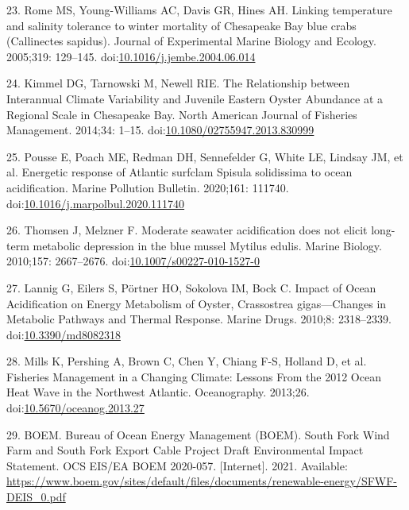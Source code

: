 \documentclass[
  10pt,
]{article}
\begin{document}
\leavevmode\hypertarget{ref-rome_linking_2005}{}%
23. Rome MS, Young-Williams AC, Davis GR, Hines AH. Linking temperature
and salinity tolerance to winter mortality of Chesapeake Bay blue crabs
(Callinectes sapidus). Journal of Experimental Marine Biology and
Ecology. 2005;319: 129--145.
doi:\href{https://doi.org/10.1016/j.jembe.2004.06.014}{10.1016/j.jembe.2004.06.014}

\leavevmode\hypertarget{ref-kimmel_relationship_2014}{}%
24. Kimmel DG, Tarnowski M, Newell RIE. The Relationship between
Interannual Climate Variability and Juvenile Eastern Oyster Abundance at
a Regional Scale in Chesapeake Bay. North American Journal of Fisheries
Management. 2014;34: 1--15.
doi:\href{https://doi.org/10.1080/02755947.2013.830999}{10.1080/02755947.2013.830999}

\leavevmode\hypertarget{ref-pousse_energetic_2020}{}%
25. Pousse E, Poach ME, Redman DH, Sennefelder G, White LE, Lindsay JM,
et al. Energetic response of Atlantic surfclam Spisula solidissima to
ocean acidification. Marine Pollution Bulletin. 2020;161: 111740.
doi:\href{https://doi.org/10.1016/j.marpolbul.2020.111740}{10.1016/j.marpolbul.2020.111740}

\leavevmode\hypertarget{ref-thomsen_moderate_2010}{}%
26. Thomsen J, Melzner F. Moderate seawater acidification does not
elicit long-term metabolic depression in the blue mussel Mytilus edulis.
Marine Biology. 2010;157: 2667--2676.
doi:\href{https://doi.org/10.1007/s00227-010-1527-0}{10.1007/s00227-010-1527-0}

\leavevmode\hypertarget{ref-lannig_impact_2010}{}%
27. Lannig G, Eilers S, Pörtner HO, Sokolova IM, Bock C. Impact of Ocean
Acidification on Energy Metabolism of Oyster, Crassostrea
gigas---Changes in Metabolic Pathways and Thermal Response. Marine
Drugs. 2010;8: 2318--2339.
doi:\href{https://doi.org/10.3390/md8082318}{10.3390/md8082318}

\leavevmode\hypertarget{ref-mills_fisheries_2013}{}%
28. Mills K, Pershing A, Brown C, Chen Y, Chiang F-S, Holland D, et al.
Fisheries Management in a Changing Climate: Lessons From the 2012 Ocean
Heat Wave in the Northwest Atlantic. Oceanography. 2013;26.
doi:\href{https://doi.org/10.5670/oceanog.2013.27}{10.5670/oceanog.2013.27}

\leavevmode\hypertarget{ref-boem_bureau_2021}{}%
29. BOEM. Bureau of Ocean Energy Management (BOEM). South Fork Wind Farm
and South Fork Export Cable Project Draft Environmental Impact
Statement. OCS EIS/EA BOEM 2020-057. {[}Internet{]}. 2021. Available:
\url{https://www.boem.gov/sites/default/files/documents/renewable-energy/SFWF-DEIS_0.pdf}
\end{document}
